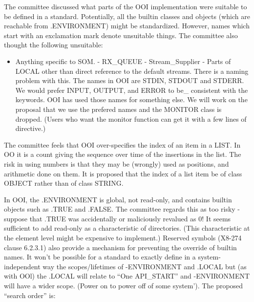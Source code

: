 The committee discussed what parts of the OOI implementation were
suitable to be defined in a standard. Potentially, all the builtin
classes and objects (which are reachable from .ENVIRONMENT) might be
standardized. However, names which start with an exclamation mark denote
unsuitable things. The committee also thought the following unsuitable:

\begin{itemize}
\tightlist
\item
  Anything specific to SOM. - RX\_QUEUE - Stream\_Supplier - Parts of
  LOCAL other than direct reference to the default streams. There is a
  naming problem with this. The names in OOI are STDIN, STDOUT and
  STDERR. We would prefer INPUT, OUTPUT, and ERROR to be\_ consistent
  with the keywords. OOI has used those names for something else. We
  will work on the proposal that we use the prefered names and the
  MONITOR class is dropped. (Users who want the monitor function can get
  it with a few lines of directive.)
\end{itemize}

The committee feels that OOI over-specifies the index of an item in a
LIST. In OO it is a count giving the sequence over time of the
insertions in the list. The risk in using numbers is that they may be
(wrongly) used as positions, and arithmetic done on them. It is proposed
that the index of a list item be of class OBJECT rather than of class
STRING.

In OOI, the .ENVIRONMENT is global, not read-only, and contains builtin
objects such as .TRUE and .FALSE. The committee regards this as too
risky - suppose that .TRUE was accidentally or maliciously revalued as
0! It seems sufficient to add read-only as a characteristic of
directories. (This characteristic at the element level might be
expensive to implement.) Reserved symbols (X8-274 clause 6.2.3.1) also
provide a mechanism for preventing the override of builtin names. It
won't be possible for a standard to exactly define in a
system-independent way the scopes/lifetimes of -ENVIRONMENT and .LOCAL
but (as with OOl) the .LOCAL will relate to ``One API\_START'' and
-ENVIRONMENT will have a wider scope. (Power on to power off of some
system'). The proposed ``search order'' is:

